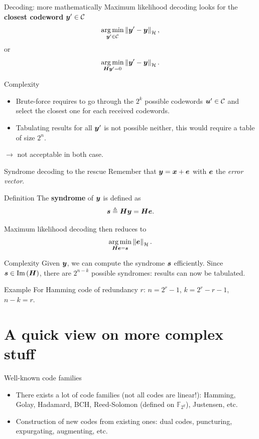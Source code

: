 \documentclass[10pt]{beamer}
\newcommand{\hw}[1]{\norm{#1}_\mathcal{H}}
\newcommand{\im}[1]{\text{Im}\left(#1\right)}
\begin{document}
\begin{frame}{Decoding: more mathematically}
    Maximum likelihood decoding looks for the \textbf{closest codeword} $\boldsymbol{y}' \in
    \mathcal{C}$
    \[ \argmin_{\vy'\in\mathcal{C}} \hw{\vy'-\vy}, \]
    or
    \[\argmin_{\mH\vy' = 0} \hw{\vy'-\vy}. \]
    
    \begin{alertblock}{Complexity}
        \begin{itemize}
            \item Brute-force requires to go through the $2^k$ possible codewords $\boldsymbol{u}' \in
            \mathcal{C}$ and select the closest one for each received codewords.
            \item Tabulating results for all $\boldsymbol{y}'$ is not possible neither, this would
            require a table of size $2^n$.
        \end{itemize}
        {\color{red}$\rightarrow$ not acceptable in both case}.
    \end{alertblock}    
\end{frame}

\begin{frame}{Syndrome decoding to the rescue}
    Remember that $\boldsymbol{y} = \boldsymbol{x} + \boldsymbol{e}$ with $\boldsymbol{e}$ the \textit{error vector}.
    \begin{block}{Definition}
        The \textbf{syndrome} of $\boldsymbol{y}$ is defined as
        \[ \boldsymbol{s} \triangleq \boldsymbol{H}\boldsymbol{y} = \boldsymbol{H}\boldsymbol{e}. \] 
    \end{block}
    Maximum likelihood decoding then reduces to
    \[ \argmin_{\mH\ve = \vs}\hw{\ve}. \]
    \begin{exampleblock}{Complexity}
        Given $\boldsymbol{y}$, we can compute the syndrome $\boldsymbol{s}$ efficiently. Since $\vs \in \im{\mH}$,
        there are $2^{n-k}$ possible syndromes: results can now be tabulated.
    \end{exampleblock}
    \begin{block}{Example}
        For Hamming code of redundancy $r$: $n = 2^r-1$, $k = 2^r-r-1$, $n-k = r$.
    \end{block}
\end{frame}

\section{A quick view on more complex stuff}

\begin{frame}{Well-known code families}
    \begin{itemize}
        \item There exists a lot of code families (not all codes
        are linear!): Hamming, Golay, Hadamard, BCH, Reed-Solomon
        (defined on $\mathbb{F}_{2^q}$), Justensen, etc.
        \item Construction of new codes from existing ones: dual codes, puncturing,
        expurgating, augmenting, etc.
    \end{itemize}    
\end{frame}
\end{document}

